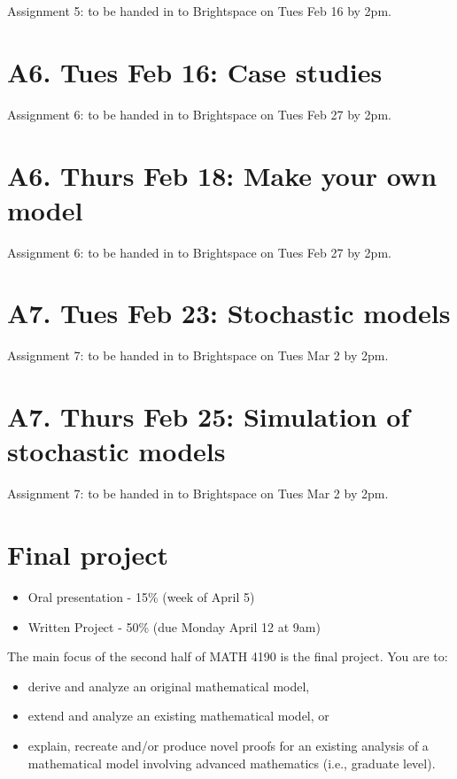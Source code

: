 \documentclass[]{book}
\providecommand{\tightlist}{%
  \setlength{\itemsep}{0pt}\setlength{\parskip}{0pt}}
\begin{document}
Assignment 5: to be handed in to Brightspace on Tues Feb 16 by 2pm.

\chapter{A6. Tues Feb 16: Case
studies}\label{a6.-tues-feb-16-case-studies}

Assignment 6: to be handed in to Brightspace on Tues Feb 27 by 2pm.

\chapter{A6. Thurs Feb 18: Make your own
model}\label{a6.-thurs-feb-18-make-your-own-model}

Assignment 6: to be handed in to Brightspace on Tues Feb 27 by 2pm.

\chapter{A7. Tues Feb 23: Stochastic
models}\label{a7.-tues-feb-23-stochastic-models}

Assignment 7: to be handed in to Brightspace on Tues Mar 2 by 2pm.

\chapter{A7. Thurs Feb 25: Simulation of stochastic
models}\label{a7.-thurs-feb-25-simulation-of-stochastic-models}

Assignment 7: to be handed in to Brightspace on Tues Mar 2 by 2pm.

\chapter{Final project}\label{final-project}

\begin{itemize}
\tightlist
\item
  Oral presentation - 15\% (week of April 5)
\item
  Written Project - 50\% (due Monday April 12 at 9am)
\end{itemize}

The main focus of the second half of MATH 4190 is the final project. You
are to:

\begin{itemize}
\tightlist
\item
  derive and analyze an original mathematical model,
\item
  extend and analyze an existing mathematical model, or
\item
  explain, recreate and/or produce novel proofs for an existing analysis
  of a mathematical model involving advanced mathematics (i.e., graduate
  level).
\end{itemize}
\end{document}
